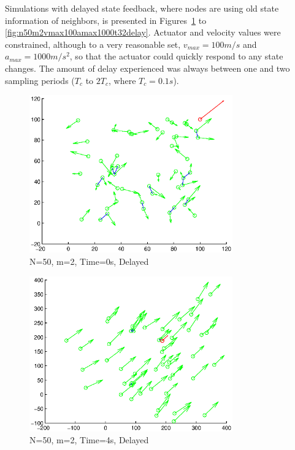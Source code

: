 \documentclass[10pt, conference]{IEEEtran}
\begin{document}
Simulations with delayed state feedback, where nodes are using old state information of neighbors, is presented in Figures~\ref{fig:n50m2vmax100amax1000t00delay} to \ref{fig:n50m2vmax100amax1000t32delay}.
%
Actuator and velocity values were constrained, although to a very reasonable set, $v_{max}=100m/s$ and $a_{max}=1000m/s^2$, so that the actuator could quickly respond to any state changes.
%
The amount of delay experienced was always between one and two sampling periods ($T_c$ to $2T_c$, where $T_c = 0.1s$).

\begin{figure}[!h]
  \begin{center}
    \includegraphics[width=3.45in]{n50m2vmax100amax1000t00delay}
  \end{center}

  \caption{\small N=50, m=2, Time=0s, Delayed}
  \label{fig:n50m2vmax100amax1000t00delay}
\end{figure}

\begin{figure}[!h]
  \begin{center}
    \includegraphics[width=3.45in]{n50m2vmax100amax1000t04delay}
  \end{center}

  \caption{\small N=50, m=2, Time=4s, Delayed}
  \label{fig:n50m2vmax100amax1000t04delay}
\end{figure}
\end{document}
